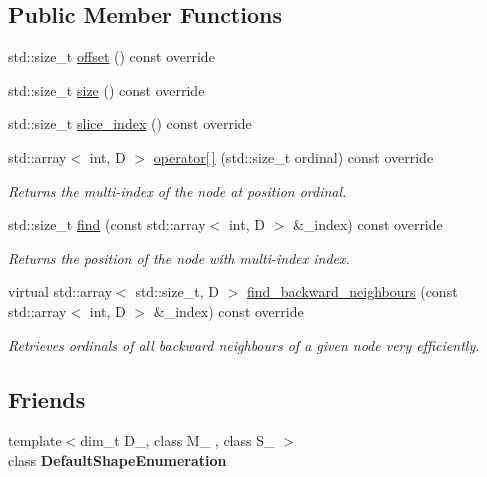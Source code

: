 \subsection*{Public Member Functions}
\begin{DoxyCompactItemize}
\item 
std\+::size\+\_\+t \hyperlink{classwaveblocks_1_1_default_shape_slice_aab9cf7a4e321da979afbc6c6b8d27d82}{offset} () const override
\item 
std\+::size\+\_\+t \hyperlink{classwaveblocks_1_1_default_shape_slice_a9e38e466352a0f0023e1fb417be1bf07}{size} () const override
\item 
std\+::size\+\_\+t \hyperlink{classwaveblocks_1_1_default_shape_slice_ad43e2ba8c9f6de8215afe3058f379c29}{slice\+\_\+index} () const override
\item 
std\+::array$<$ int, D $>$ \hyperlink{classwaveblocks_1_1_default_shape_slice_afe08f1250a3e74ec685757b8c5456428}{operator\mbox{[}$\,$\mbox{]}} (std\+::size\+\_\+t ordinal) const override
\begin{DoxyCompactList}\small\item\em Returns the multi-\/index of the node at position {\itshape ordinal}. \end{DoxyCompactList}\item 
std\+::size\+\_\+t \hyperlink{classwaveblocks_1_1_default_shape_slice_ae44dd6209de700b5a370f3815979b883}{find} (const std\+::array$<$ int, D $>$ \&\+\_\+index) const override
\begin{DoxyCompactList}\small\item\em Returns the position of the node with multi-\/index {\ttfamily index}. \end{DoxyCompactList}\item 
virtual std\+::array$<$ std\+::size\+\_\+t, D $>$ \hyperlink{classwaveblocks_1_1_default_shape_slice_a798802b140b441811e9d5ac74b16fb53}{find\+\_\+backward\+\_\+neighbours} (const std\+::array$<$ int, D $>$ \&\+\_\+index) const override
\begin{DoxyCompactList}\small\item\em Retrieves ordinals of all backward neighbours of a given node very efficiently. \end{DoxyCompactList}\end{DoxyCompactItemize}
\subsection*{Friends}
\begin{DoxyCompactItemize}
\item 
\hypertarget{classwaveblocks_1_1_default_shape_slice_a084d0e149c246b1f4005cbae9347ace1}{}{\footnotesize template$<$dim\+\_\+t D\+\_\+, class M\+\_\+ , class S\+\_\+ $>$ }\\class {\bfseries Default\+Shape\+Enumeration}\label{classwaveblocks_1_1_default_shape_slice_a084d0e149c246b1f4005cbae9347ace1}

\end{DoxyCompactItemize}


